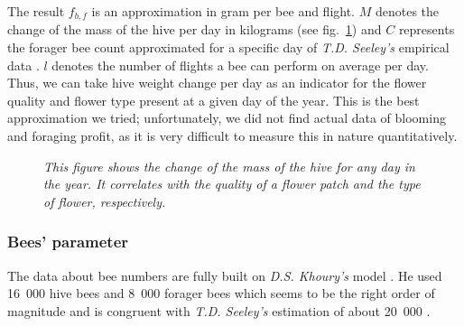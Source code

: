 			The result $f_{b,f}$ is an approximation in gram per bee and flight. $M$ denotes the change of the mass of the hive per day in kilograms (see fig.~\ref{fig:seasonalFlowers}) and $C$ represents the forager bee count approximated for a specific day of \textit{T.D. Seeley's} empirical data \cite{seeley95}. $l$ denotes the number of flights a bee can perform on average per day. Thus, we can take hive weight change per day as an indicator for the flower quality and flower type present at a given day of the year. This is the best approximation we tried; unfortunately, we did not find actual data of blooming and foraging profit, as it is very difficult to measure this in nature quantitatively.
			
			\begin{figure}[H]
				\centering
				\caption{\textit{This figure shows the change of the mass of the hive for any day in the year. It correlates with the quality of a flower patch and the type of flower, respectively.}}
				\label{fig:seasonalFlowers}
			\end{figure}
			
		\subsubsection{Bees' parameter}
			\label{chap:beesParameters}
			The data about bee numbers are fully built on \textit{D.S. Khoury's} model \cite{khoury13}. He used 16~000 hive bees and 8~000 forager bees which seems to be the right order of magnitude and is congruent with \textit{T.D. Seeley's} estimation of about 20~000 \cite{seeley95}.\\ 		
			
